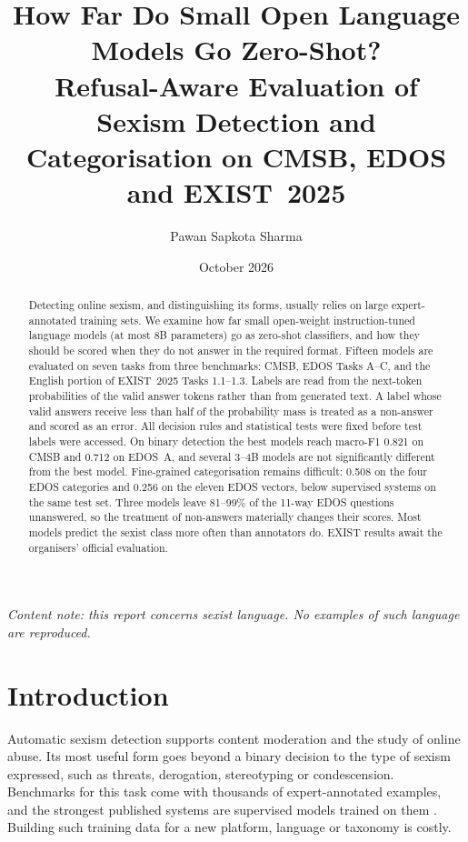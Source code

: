 \documentclass[11pt]{article}
\title{How Far Do Small Open Language Models Go Zero-Shot?\\[2pt]
\large Refusal-Aware Evaluation of Sexism Detection and Categorisation on CMSB, EDOS and EXIST~2025}
\author{Pawan Sapkota Sharma}
\date{October 2026}
\begin{document}
\maketitle

\begin{center}
\small\textit{Content note: this report concerns sexist language. No examples of such language are reproduced.}
\end{center}

\begin{abstract}
Detecting online sexism, and distinguishing its forms, usually relies on large expert-annotated training sets. We examine how far small open-weight instruction-tuned language models (at most 8B parameters) go as zero-shot classifiers, and how they should be scored when they do not answer in the required format. Fifteen models are evaluated on seven tasks from three benchmarks: CMSB, EDOS Tasks A--C, and the English portion of EXIST~2025 Tasks 1.1--1.3. Labels are read from the next-token probabilities of the valid answer tokens rather than from generated text. A label whose valid answers receive less than half of the probability mass is treated as a non-answer and scored as an error. All decision rules and statistical tests were fixed before test labels were accessed. On binary detection the best models reach macro-F1 0.821 on CMSB and 0.712 on EDOS~A, and several 3--4B models are not significantly different from the best model. Fine-grained categorisation remains difficult: 0.508 on the four EDOS categories and 0.256 on the eleven EDOS vectors, below supervised systems on the same test set. Three models leave 81--99\% of the 11-way EDOS questions unanswered, so the treatment of non-answers materially changes their scores. Most models predict the sexist class more often than annotators do. EXIST results await the organisers' official evaluation.
\end{abstract}

\section{Introduction}\label{sec:intro}
Automatic sexism detection supports content moderation and the study of online abuse. Its most useful form goes beyond a binary decision to the type of sexism expressed, such as threats, derogation, stereotyping or condescension. Benchmarks for this task \citep{samory2021callme,kirk2023semeval,plaza2025exist} come with thousands of expert-annotated examples, and the strongest published systems are supervised models trained on them \citep{kirk2023semeval}. Building such training data for a new platform, language or taxonomy is costly.
\end{document}
